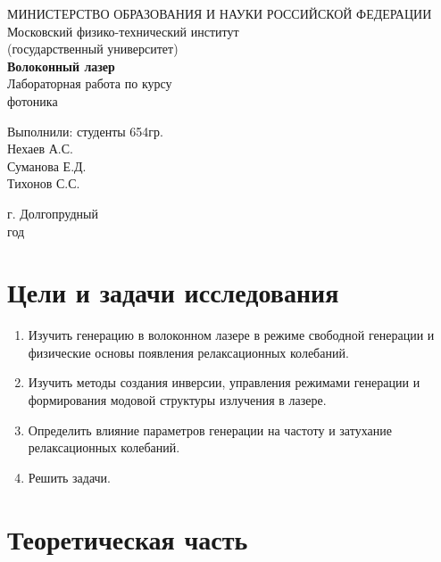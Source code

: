 \documentclass[a4paper, 12pt]{article}
\begin{document}
	\begin{titlepage}
		\begin{center}
		МИНИСТЕРСТВО ОБРАЗОВАНИЯ И НАУКИ РОССИЙСКОЙ ФЕДЕРАЦИИ\\
		\footnotesize{Московский физико-технический институт}\\
		\footnotesize{(государственный университет)}\\
		\vfill
		{\LARGE
		\textbf{Волоконный лазер}\\
		}
		\vspace{1cm}
		Лабораторная работа по курсу\\
		фотоника
		\vfill
		\begin{flushright}
			Выполнили: студенты 654гр.\\
			Нехаев А.С.\\
			Суманова Е.Д.\\
			Тихонов С.С.
		\end{flushright}
		\vfill
		г. Долгопрудный\\
		\the\year\:год
		\end{center}
	\end{titlepage}
	\newpage
	\tableofcontents
	\newpage
	\section{Цели и задачи исследования}
	\begin{enumerate}
		\item Изучить генерацию в волоконном лазере в режиме свободной генерации и физические основы появления релаксационных колебаний.
		\item Изучить методы создания инверсии, управления режимами генерации и формирования модовой структуры излучения в лазере.
		\item Определить влияние параметров генерации на частоту и затухание релаксационных колебаний.
		\item Решить задачи.
	\end{enumerate}
	\newpage
	\section{Теоретическая часть}
\end{document}

